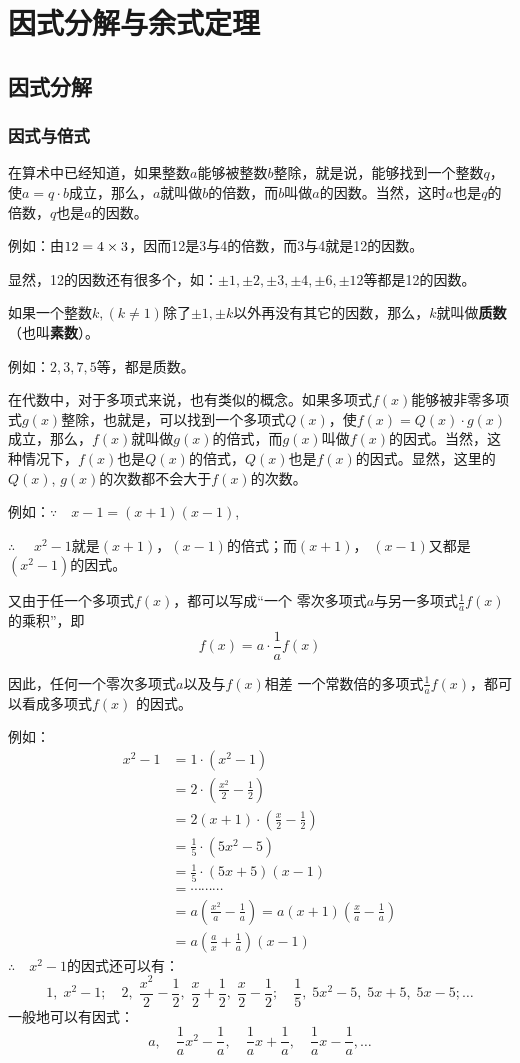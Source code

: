 \chapter{因式分解与余式定理}
\section{因式分解}
\subsection{因式与倍式}

在算术中已经知道，如果整数$a$能够被整数$b$整除，就是说，能够找到一个整数$q$，使$a=q\cdot b$成立，那么，$a$就叫做$b$的倍数，而$b$叫做$a$的因数。当然，这时$a$也是$q$的倍数，$q$也是$a$的因数。

例如：由$12=4\times3$，因而12是3与4的倍数，而3与4就是12的因数。

显然，12的因数还有很多个，如：$\pm1,\pm2,\pm3,\pm4,\pm6,\pm12$等都是12的因数。

如果一个整数$k, (k\ne 1)$除了$\pm1,\pm k$以外再没有其它的因数，那么，$k$就叫做\textbf{质数}（也叫\textbf{素数}）。

例如：$2, 3, 7, 5$等，都是质数。

在代数中，对于多项式来说，也有类似的概念。如果多项式$f(x)$能够被非零多项式$g(x)$整除，也就是，可以找到一个多项式$Q(x)$，使$f(x)=Q(x)\cdot g(x)$成立，那么，$f(x)$就叫做$g(x)$的倍式，而$g(x)$叫做$f(x)$的因式。当然，这种情况下，$f(x)$也是$Q(x)$的倍式，$Q(x)$也是$f(x)$的因式。显然，这里的$Q(x)$, $g(x)$的次数都不会大于$f(x)$的次数。

例如：$\because\quad x-1=(x+1)(x-1)$,

$\therefore\quad $ $x^2-1$就是$(x+1)$，$(x-1)$的倍式；而$(x+1)$，
$(x-1)$又都是$(x^2-1)$的因式。

又由于任一个多项式$f(x)$，都可以写成“一个
零次多项式$a$与另一多项式$\frac{1}{a}f(x)$的乘积”，即
\[f(x)=a\cdot \frac{1}{a}f(x)\]

因此，任何一个零次多项式$a$以及与$f(x)$相差
一个常数倍的多项式$\frac{1}{a}f(x)$，都可以看成多项式$f(x)$
的因式。

例如：\[\begin{split}
x^2-1&= 1\cdot (x^2-1)\\
&=2\cdot \left(\frac{x^2}{2}-\frac{1}{2}\right)\\    
&=2(x+1)\cdot \left(\frac{x}{2}-\frac{1}{2}\right)\\
&=\frac{1}{5}\cdot (5x^2-5)\\
&=\frac{1}{5}\cdot (5x+5)(x-1)\\
&=\cdots \cdots \cdots \\
&=a\left(\frac{x^2}{a}-\frac{1}{a}\right)=a(x+1)\left(\frac{x}{a}-\frac{1}{a}\right)\\
&=a\left(\frac{a}{x}+\frac{1}{a}\right)(x-1)
\end{split}\]
$\therefore\quad x^2-1$的因式还可以有：
\[1,\; x^2-1;\quad 2,\; \frac{x^2}{2}-\frac{1}{2},\; \frac{x}{2}+\frac{1}{2},\; \frac{x}{2}-\frac{1}{2};\quad \frac{1}{5},\; 5x^2-5,\; 5x+5,\; 5x-5; \ldots \]
一般地可以有因式：
\[a,\quad \frac{1}{a}x^2-\frac{1}{a},\quad \frac{1}{a}x+\frac{1}{a},\quad \frac{1}{a}x-\frac{1}{a},\ldots\]

